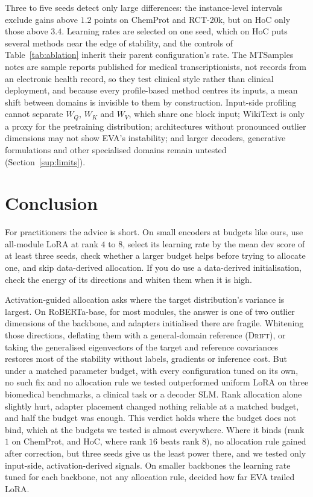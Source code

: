 \documentclass[conference]{IEEEtran}
\newcommand{\method}{\textsc{Drift}}
\begin{document}
Three to five seeds detect only large differences: the instance-level intervals
exclude gains above $1.2$ points on ChemProt and RCT-20k, but on HoC only those
above $3.4$. Learning rates are selected on one seed, which on HoC puts several
methods near the edge of stability, and the controls of
Table~\ref{tab:ablation} inherit their parent configuration's rate. The MTSamples
notes are sample reports published for medical transcriptionists, not records
from an electronic health record, so they test clinical style rather than
clinical deployment, and because every profile-based method centres its inputs,
a mean shift between domains is invisible to them by construction. Input-side
profiling cannot separate $W_Q$, $W_K$ and $W_V$, which share one block input;
WikiText is only a proxy for the pretraining distribution; architectures without
pronounced outlier dimensions may not show EVA's instability; and larger
decoders, generative formulations and other specialised domains remain untested
(Section~\ref{sup:limits}).

\section{Conclusion}

For practitioners the advice is short. On small encoders at budgets like ours,
use all-module LoRA at rank $4$ to $8$, select its learning rate by the mean dev
score of at least three seeds, check whether a larger budget helps before trying
to allocate one, and skip data-derived allocation. If you do use a data-derived
initialisation, check the energy of its directions and whiten them when it is
high.

Activation-guided allocation asks where the target distribution's variance is
largest. On RoBERTa-base, for most modules, the answer is one of two outlier
dimensions of the backbone, and adapters initialised there are fragile.
Whitening those directions, deflating them with a general-domain reference
(\method{}), or taking the generalised eigenvectors of the target and reference
covariances restores most of the stability without labels, gradients or
inference cost. But under a matched parameter budget, with every configuration
tuned on its own, no such fix and no allocation rule we tested outperformed
uniform LoRA on three biomedical benchmarks, a clinical task or a decoder SLM.
Rank allocation alone slightly hurt, adapter placement changed nothing reliable
at a matched budget, and half the budget was enough. This verdict holds where
the budget does not bind, which at the budgets we tested is almost everywhere.
Where it binds (rank $1$ on ChemProt, and HoC, where rank $16$ beats rank $8$),
no allocation rule gained after correction, but three seeds give us the least
power there, and we tested only input-side, activation-derived signals. On
smaller backbones the learning rate tuned for each backbone, not any allocation
rule, decided how far EVA trailed LoRA.
\end{document}

